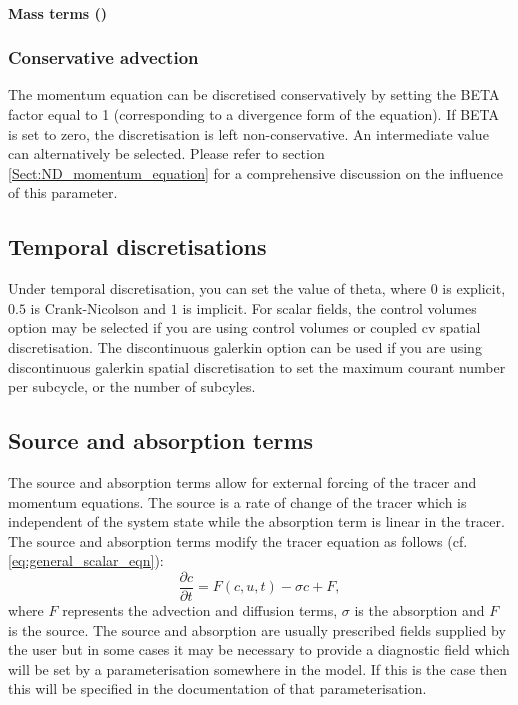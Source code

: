 \paragraph{Mass terms ()}

\subsubsection{Conservative advection}

The momentum equation can be discretised conservatively by setting the
BETA factor equal to 1 (corresponding to a divergence form of the
equation). If BETA is set to zero, the discretisation is left
non-conservative. An intermediate value can alternatively be
selected. Please refer to section \ref{Sect:ND_momentum_equation} for a comprehensive discussion on the influence of this parameter.


\subsection{Temporal discretisations}
\label{sect:configuring_fluidity_temporal_discretisation}
Under temporal discretisation, you can set the value of theta, where $0$ is explicit, $0.5$ is Crank-Nicolson and $1$ is implicit. For scalar fields, the control volumes option may be selected if you are using control volumes or coupled cv spatial discretisation. The discontinuous galerkin option can be used if you are using discontinuous galerkin spatial discretisation to set the maximum courant number per subcycle, or the number of subcyles. 

\subsection{Source and absorption terms}\label{Sect:Source}

The source and absorption terms allow for external forcing of the tracer and
momentum equations. The source is a rate of change of the tracer which is
independent of the system state while the absorption term is linear in the
tracer. The source and absorption terms modify the tracer
equation as follows (cf. \eqref{eq:general_scalar_eqn}):
\begin{equation}
  \frac{\partial c}{\partial t} = F(c,u,t) - \sigma c + F,
\end{equation}
where $F$ represents the advection and diffusion terms, $\sigma$ is the
absorption and $F$ is the source. The source and absorption are usually
prescribed fields supplied by the user but in some cases it may be necessary
to provide a diagnostic field which will be set by a parameterisation
somewhere in the model. If this is the case then this will be specified in
the documentation of that parameterisation.

